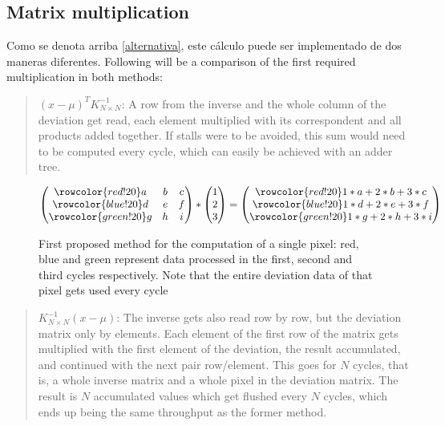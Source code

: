 \subsection{Matrix multiplication}


\newcommand\rb{\colorbox{red!20}}
\newcommand\bb{\colorbox{blue!20}}
\newcommand\gb{\colorbox{green!20}}
\newcommand\rr{\rowcolor{red!20}}
\newcommand\br{\rowcolor{blue!20}}
\newcommand\gr{\rowcolor{green!20}}
Como se denota arriba \ref{alternativa}, este cálculo puede ser implementado de dos maneras diferentes.
\noindent Following will be a comparison of the first required multiplication in both methods:
\begin{quote}
	\((x-\mu)^{T} K^{-1}_{N \times N}\):	
	A row from the inverse and the whole column of the deviation get read, each element multiplied with its correspondent and all products added together. If stalls were to be avoided, this sum would need to be computed every cycle, which can easily be achieved with an adder tree.
\end{quote}

\begin{figure}[h]%
\[
\begin{pmatrix}
\rr a & b & c \\ 
\br d & e & f \\ 
\gr g & h & i
\end{pmatrix}
*
\begin{pmatrix}
1\\
2\\
3
\end{pmatrix}
=
\begin{pmatrix}
\rr 1*a+2*b+3*c\\
\br 1*d+2*e+3*f\\
\gr 1*g+2*h+3*i
\end{pmatrix} 
\]
\caption[Optional: Short caption to appear in List of Figures]{First proposed method for the computation of a single pixel: red, blue and green represent data processed in the first, second and third cycles respectively. Note that the entire deviation data of that pixel gets used every cycle}
\end{figure}
\pagebreak
		
\begin{quote}
	\(K^{-1}_{N \times N} (x-\mu)\):
	The inverse gets also read row by row, but the deviation matrix only by elements. Each element of the first row of the matrix gets multiplied with the first element of the deviation, the result accumulated, and continued with the next pair row/element. This goes for \(N\) cycles, that is, a whole inverse matrix and a whole pixel in the deviation matrix. The result is \(N\) accumulated values which get flushed every \(N\) cycles, which ends up being the same throughput as the former method.
\end{quote}

